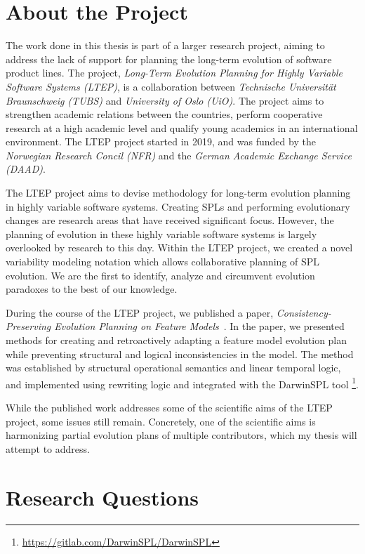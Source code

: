 \documentclass[a4paper,english]{ifimaster}
\begin{document}
\section{About the Project}%
\label{sec:about_the_project}

The work done in this thesis is part of a larger research project, aiming to address the lack of support for planning the long-term evolution of software product lines. The project, \textit{Long-Term Evolution Planning for Highly Variable Software Systems (LTEP)}, is a collaboration between \textit{Technische Universität Braunschweig (TUBS)} and \textit{University of Oslo (UiO)}. The project aims to strengthen academic relations between the countries, perform cooperative research at a high academic level and  qualify young academics in an international environment. The LTEP project started in 2019, and was funded by the \textit{Norwegian Research Concil (NFR)} and the \textit{German Academic Exchange Service (DAAD)}.

The LTEP project aims to devise methodology for long-term evolution planning in highly variable software systems. Creating SPLs and performing evolutionary changes are research areas that have received significant focus. However, the planning of evolution in these highly variable software systems is largely overlooked by research to this day. Within the LTEP project, we created a novel variability modeling notation which allows collaborative planning of SPL evolution. We are the first to identify, analyze and circumvent evolution paradoxes to the best of our knowledge.

During the course of the LTEP project, we published a paper, \textit{Consistency-Preserving Evolution Planning on Feature Models}~\cite{cite:consistency_preserving_evolution_planning}. In the paper, we presented methods for creating and retroactively adapting a feature model evolution plan while preventing structural and logical inconsistencies in the model. The method was established by structural operational semantics and linear temporal logic, and implemented using rewriting logic and integrated with the DarwinSPL tool \footnote{\url{https://gitlab.com/DarwinSPL/DarwinSPL}}.

While the published work addresses some of the scientific aims of the LTEP project, some issues still remain. Concretely, one of the scientific aims is harmonizing partial evolution plans of multiple contributors, which my thesis will attempt to address.

\section{Research Questions}%
\label{sec:research_questions}
\end{document}
